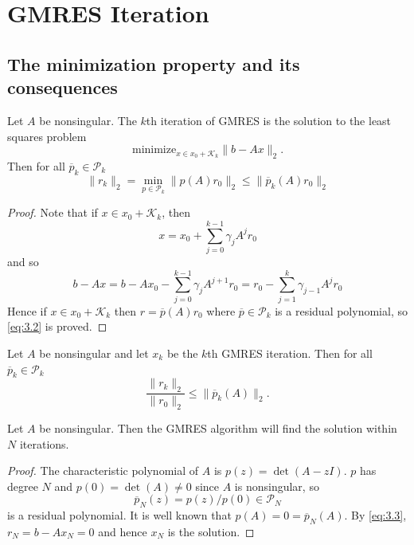 

\section{GMRES Iteration}
\label{sec:3}

\subsection{The minimization property and its consequences}
\label{sec:3.1}

\begin{thm}
  Let $A$ be nonsingular. The $k$th iteration of GMRES is the solution
  to the least squares
  problem
  \begin{equation}
    \label{eq:3.1}
    \text{minimize}_{x\in x_0+\mathcal{K}_k}\|b-Ax\|_2.
  \end{equation}
  Then for all $\overline{p}_k\in\mathcal{P}_k$
  \begin{equation}
    \label{eq:3.2}
    \|r_k\|_2=\min_{p\in\mathcal{P}_k}\|p(A)r_0\|_2\leq \|\overline{p}_k(A)r_0\|_2
  \end{equation}
\end{thm}

\begin{proof}
  Note that if $x\in x_0+\mathcal{K}_k$,
  then $$x=x_0+\sum\limits_{j=0}^{k-1}\gamma_{j}A^jr_0$$
  and so
  $$b-Ax=b-Ax_0-\sum\limits_{j=0}^{k-1}\gamma_{j}A^{j+1}r_0
  =r_0-\sum\limits_{j=1}^{k}\gamma_{j-1}A^jr_0$$
  Hence if $x\in x_0+\mathcal{K}_k$ then $r=\overline{p}(A)r_0$ where
  $\overline{p}\in\mathcal{P}_k$ is a residual polynomial, so
  \eqref{eq:3.2} is proved.
\end{proof}

\begin{coro}
  Let $A$ be nonsingular and let $x_k$ be the $k$th GMRES
  iteration. Then for all $\overline{p}_k\in\mathcal{P}_k$
  \begin{equation}
    \label{eq:3.3}
    \frac{\|r_k\|_2}{\|r_0\|_2}\leq \|\overline{p}_k(A)\|_2.
  \end{equation}
\end{coro}

\begin{thm}
  Let $A$ be nonsingular. Then the GMRES algorithm will find the
  solution within $N$ iterations.
\end{thm}

\begin{proof}
  The characteristic polynomial of $A$ is $p(z)=\det(A-zI)$. $p$ has
  degree $N$ and $p(0)=\det(A)\neq 0$ since $A$ is nonsingular, so
  $$\overline{p}_N(z)=p(z)/p(0)\in\mathcal{P}_N$$
  is a residual polynomial. It is well known that
  $p(A)=0=\overline{p}_N(A).$ By \eqref{eq:3.3}, $r_N=b-Ax_N=0$ and
  hence $x_N$ is the solution.
\end{proof}

